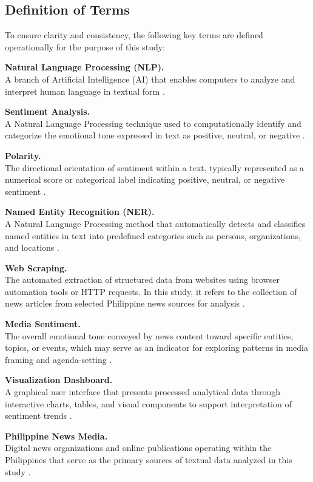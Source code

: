\subsection{Definition of Terms}
\label{definition-of-terms}

To ensure clarity and consistency, the following key terms are defined operationally for the purpose of this study:

\textbf{Natural Language Processing (NLP).}\\
A branch of Artificial Intelligence (AI) that enables computers to analyze and interpret human language in textual form \cite{ref01}.

\textbf{Sentiment Analysis.}\\
A Natural Language Processing technique used to computationally identify and categorize the emotional tone expressed in text as positive, neutral, or negative \cite{ref08,ref10}.

\textbf{Polarity.}\\
The directional orientation of sentiment within a text, typically represented as a numerical score or categorical label indicating positive, neutral, or negative sentiment \cite{ref08}.

\textbf{Named Entity Recognition (NER).}\\
A Natural Language Processing method that automatically detects and classifies named entities in text into predefined categories such as persons, organizations, and locations \cite{ref12,ref26}.

\textbf{Web Scraping.}\\
The automated extraction of structured data from websites using browser automation tools or HTTP requests. In this study, it refers to the collection of news articles from selected Philippine news sources for analysis \cite{ref30}.

\textbf{Media Sentiment.}\\
The overall emotional tone conveyed by news content toward specific entities, topics, or events, which may serve as an indicator for exploring patterns in media framing and agenda-setting \cite{ref04,ref11}.

\textbf{Visualization Dashboard.}\\
A graphical user interface that presents processed analytical data through interactive charts, tables, and visual components to support interpretation of sentiment trends \cite{ref31,ref34}.

\textbf{Philippine News Media.}\\
Digital news organizations and online publications operating within the Philippines that serve as the primary sources of textual data analyzed in this study \cite{ref03,ref17}.

